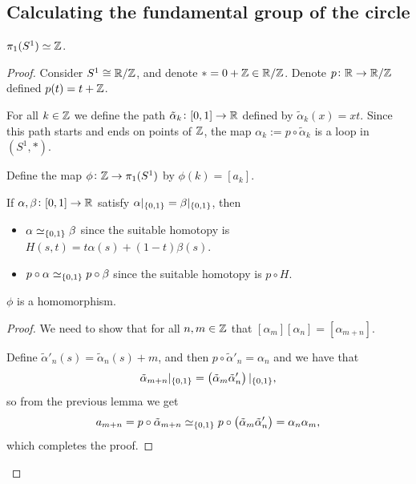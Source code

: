 \documentclass[11pt,a4paper]{article}
\begin{document}
\subsection{Calculating the fundamental group of the circle}
\begin{theorem}
  $\pi_1(S^1) \simeq \mathbb{Z}$.
\end{theorem}
\begin{proof}
  Consider $S^1 \cong \mathbb{R}/\mathbb{Z}$, and denote $* = 0 + \mathbb{Z} \in \mathbb{R}/\mathbb{Z}$.
  Denote $p \colon \mathbb{R} \to \mathbb{R}/\mathbb{Z}$ defined $p(t) = t + \mathbb{Z}$.

  For all $k \in \mathbb{Z}$ we define the path $\tilde \alpha_k \colon [0,1] \to \mathbb{R}$
  defined by $\tilde \alpha_k(x) = xt$.
  Since this path starts and ends on points of $\mathbb{Z}$, the map
  $\alpha_k := p \circ \tilde \alpha_k$ is a loop in $(S^1,*)$.

  Define the map $\phi \colon \mathbb{Z} \to \pi_1(S^1)$ by $\phi(k) = [a_k]$.
  
  \begin{lemma}
    If $\alpha, \beta \colon [0,1] \to \mathbb{R}$ satisfy
    $\alpha\vert_{\left\{0,1\right\}} = \beta\vert_{\left\{0,1\right\}}$, then
    \begin{itemize}
      \item $\alpha \simeq_{\left\{0,1\right\}} \beta$ since the suitable homotopy
        is $H(s,t) = t \alpha(s) + (1 - t) \beta(s)$.
      \item $p \circ \alpha \simeq_{\left\{0,1\right\}} p \circ \beta$ since
        the suitable homotopy is $p \circ H$.
    \end{itemize}
  \end{lemma}

  \begin{proposition}
    $\phi$ is a homomorphism.
  \end{proposition}
  \begin{proof}
    We need to show that for all $n,m \in \mathbb{Z}$ that
    $[\alpha_m] [\alpha_n] = [\alpha_{m+n}]$.
    
    Define $\tilde \alpha'_n(s) = \tilde \alpha_n(s) + m$,
    and then $p \circ \tilde \alpha'_n = \alpha_n$ and we have that
    \[
      \tilde \alpha_{m + n} \vert_{\set{0,1}} =
      \del{\tilde \alpha_m \tilde \alpha'_n} \vert_{\set{0,1}},
    \]
    so from the previous lemma we get
    \[
      a_{m + n} =
      p \circ \tilde \alpha_{m + n} \simeq_{\set{0,1}}
      p \circ \del{\tilde \alpha_m \tilde \alpha'_n} =
      \alpha_n \alpha_m,
    \]
    which completes the proof.
  \end{proof}


\end{proof}
\end{document}
